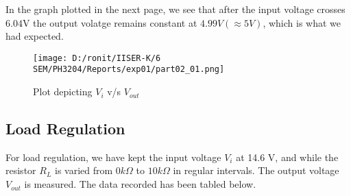 \documentclass[12pt]{article}
\begin{document}
In the graph plotted in the next page, we see that after the input voltage crosses $6.04$V the output volatge remains constant at $4.99V (\approx 5V)$, which is what we had expected. 
\begin{figure}[H]  
	\centering  
	\texttt{[image: D:/ronit/IISER-K/6 SEM/PH3204/Reports/exp01/part02\_01.png]}  %
	\caption{Plot depicting $V_{i}$ v/s $V_{out}$}  %
	\label{fig:part01_01}  %
  \end{figure}
\subsection{Load Regulation}
For load regulation, we have kept the input voltage $V_i$ at 14.6 V, and while the resistor $R_L$ is varied from $0 k\Omega$ to $10 k\Omega$ in regular intervals. The output voltage $V_{out}$ is measured. The data recorded has been tabled below.
\end{document}
